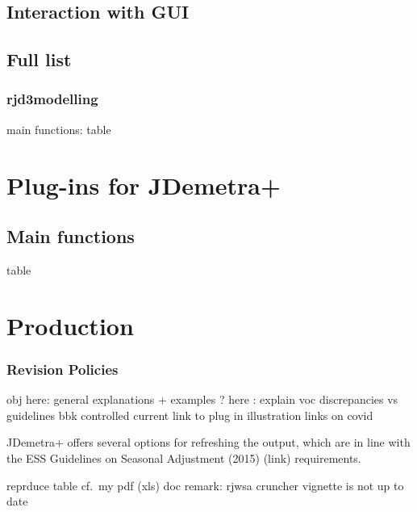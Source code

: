\documentclass[
  letterpaper,
  DIV=11,
  numbers=noendperiod]{scrreprt}
\begin{document}
\hypertarget{interaction-with-gui}{%
\section{Interaction with GUI}\label{interaction-with-gui}}

\hypertarget{full-list}{%
\section{Full list}\label{full-list}}

\hypertarget{rjd3modelling}{%
\subsection{rjd3modelling}\label{rjd3modelling}}

main functions: table

\hypertarget{plug-ins-for-jdemetra}{%
\chapter{Plug-ins for JDemetra+}\label{plug-ins-for-jdemetra}}

\hypertarget{main-functions}{%
\section{Main functions}\label{main-functions}}

table

\hypertarget{production}{%
\chapter{Production}\label{production}}

\hypertarget{revision-policies}{%
\subsection{Revision Policies}\label{revision-policies}}

obj here: general explanations + examples ? here : explain voc
discrepancies vs guidelines bbk controlled current link to plug in
illustration links on covid

JDemetra+ offers several options for refreshing the output, which are in
line with the ESS Guidelines on Seasonal Adjustment (2015) (link)
requirements.

reprduce table cf.~my pdf (xls) doc remark: rjwsa cruncher vignette is
not up to date
\end{document}
